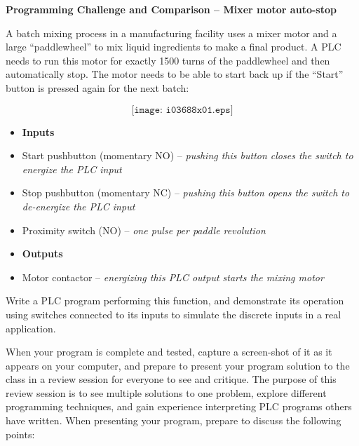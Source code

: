 

\noindent
{\bf Programming Challenge and Comparison -- Mixer motor auto-stop} 

\vskip 10pt

A batch mixing process in a manufacturing facility uses a mixer motor and a large ``paddlewheel'' to mix liquid ingredients to make a final product.  A PLC needs to run this motor for exactly 1500 turns of the paddlewheel and then automatically stop.  The motor needs to be able to start back up if the ``Start'' button is pressed again for the next batch:

$$\texttt{[image: i03688x01.eps]}$$

\begin{itemize}
\item{} {\bf Inputs} 
\item{} Start pushbutton (momentary NO) -- {\it pushing this button closes the switch to energize the PLC input}
\item{} Stop pushbutton (momentary NC) -- {\it pushing this button opens the switch to de-energize the PLC input}
\item{} Proximity switch (NO) -- {\it one pulse per paddle revolution}
\end{itemize}

\begin{itemize}
\item{} {\bf Outputs} 
\item{} Motor contactor -- {\it energizing this PLC output starts the mixing motor}
\end{itemize}

Write a PLC program performing this function, and demonstrate its operation using switches connected to its inputs to simulate the discrete inputs in a real application.  

\vskip 10pt

When your program is complete and tested, capture a screen-shot of it as it appears on your computer, and prepare to present your program solution to the class in a review session for everyone to see and critique.  The purpose of this review session is to see multiple solutions to one problem, explore different programming techniques, and gain experience interpreting PLC programs others have written.  When presenting your program, prepare to discuss the following points:

